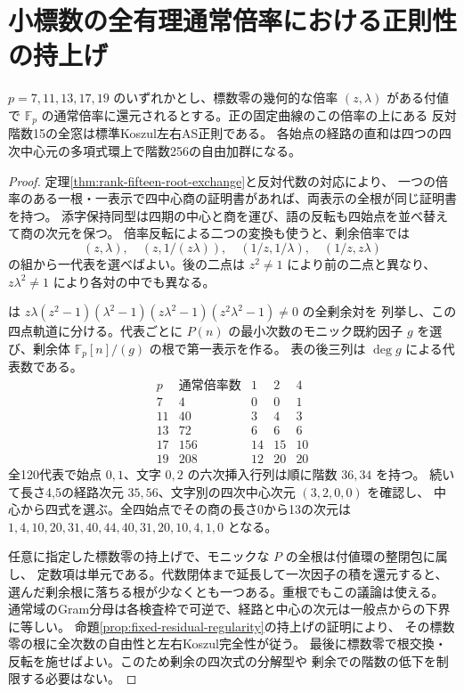 \section{小標数の全有理通常倍率における正則性の持上げ}
\label{sec:rank-fifteen-small-residues}
\begin{theorem}\label{thm:rank-fifteen-small-residues}
$p=7,11,13,17,19$ のいずれかとし、標数零の幾何的な倍率 $(z,\lambda)$ がある付値で
$\mathbb F_p$ の通常倍率に還元されるとする。正の固定曲線のこの倍率の上にある
反対階数15の全窓は標準Koszul左右AS正則である。
各始点の経路の直和は四つの四次中心元の多項式環上で階数256の自由加群になる。
\end{theorem}
\begin{proof}
定理\ref{thm:rank-fifteen-root-exchange}と反対代数の対応により、
一つの倍率のある一根・一表示で四中心商の証明書があれば、両表示の全根が同じ証明書を持つ。
添字保持同型は四期の中心と商を運び、語の反転も四始点を並べ替えて商の次元を保つ。
倍率反転による二つの変換も使うと、剰余倍率では
\[
 (z,\lambda),\quad(z,1/(z\lambda)),\quad(1/z,1/\lambda),\quad(1/z,z\lambda)
\]
の組から一代表を選べばよい。後の二点は $z^2\ne1$ により前の二点と異なり、
$z\lambda^2\ne1$ により各対の中でも異なる。

 は
$z\lambda(z^2-1)(\lambda^2-1)(z\lambda^2-1)(z^2\lambda^2-1)\ne0$ の全剰余対を
列挙し、この四点軌道に分ける。代表ごとに $P(n)$ の最小次数のモニック既約因子
$g$ を選び、剰余体 $\mathbb F_p[n]/(g)$ の根で第一表示を作る。
表の後三列は $\deg g$ による代表数である。
\[
\begin{array}{c|r|rrr}
 p&\text{通常倍率数}&1&2&4\\\hline
 7&4&0&0&1\\
 11&40&3&4&3\\
 13&72&6&6&6\\
 17&156&14&15&10\\
 19&208&12&20&20
\end{array}
\]
全120代表で始点 $0,1$、文字 $0,2$ の六次挿入行列は順に階数 $36,34$ を持つ。
続いて長さ4,5の経路次元 $35,56$、文字別の四次中心次元 $(3,2,0,0)$ を確認し、
中心から四式を選ぶ。全四始点でその商の長さ0から13の次元は
$1,4,10,20,31,40,44,40,31,20,10,4,1,0$ となる。

任意に指定した標数零の持上げで、モニックな $P$ の全根は付値環の整閉包に属し、
定数項は単元である。代数閉体まで延長して一次因子の積を還元すると、
選んだ剰余根に落ちる根が少なくとも一つある。重根でもこの議論は使える。
通常域のGram分母は各検査枠で可逆で、経路と中心の次元は一般点からの下界に等しい。
命題\ref{prop:fixed-residual-regularity}の持上げの証明により、
その標数零の根に全次数の自由性と左右Koszul完全性が従う。
最後に標数零で根交換・反転を施せばよい。このため剰余の四次式の分解型や
剰余での階数の低下を制限する必要はない。
\end{proof}
